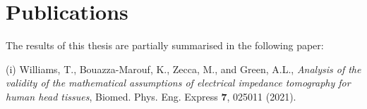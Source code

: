 
\chapter*{Publications}

The results of this thesis are partially summarised in the following paper: %

\vspace{0.2cm}
\hspace{-1.7cm}(i) Williams, T.,  Bouazza-Marouf, K., Zecca, M., and Green, A.L., \emph{Analysis of the validity of the mathematical assumptions of electrical impedance tomography for human head tissues}, Biomed. Phys. Eng. Express \textbf{7}, 025011 (2021).





